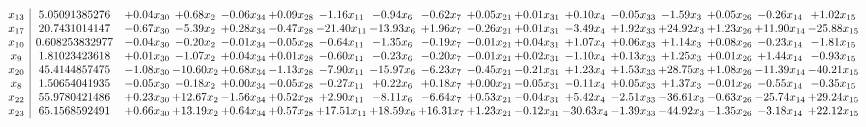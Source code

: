 \documentclass[9pt]{article}
\begin{document}
 \[\begin{array}{c| c c@{\hskip 2pt} c@{\hskip 2pt} c@{\hskip 2pt} c@{\hskip 2pt} c@{\hskip 2pt} c@{\hskip 2pt} c@{\hskip 2pt} c@{\hskip 2pt} c@{\hskip 2pt} c@{\hskip 2pt} c@{\hskip 2pt} c@{\hskip 2pt} c@{\hskip 2pt} c@{\hskip 2pt} c@{\hskip 2pt} }
 x_{13}   &  5.05091385276 & +  0.04 x_{30} & +  0.68 x_{2} & -0.06 x_{34} & +  0.09 x_{28} & -1.16 x_{11} & -0.94 x_{6} & -0.62 x_{7} & +  0.05 x_{21} & +  0.01 x_{31} & +  0.10 x_{4} & -0.05 x_{33} & -1.59 x_{3} & +  0.05 x_{26} & -0.26 x_{14} & +  1.02 x_{15}\\
 x_{17}   &  20.7431014147 & -0.67 x_{30} & -5.39 x_{2} & +  0.28 x_{34} & -0.47 x_{28} & -21.40 x_{11} & -13.93 x_{6} & +  1.96 x_{7} & -0.26 x_{21} & +  0.01 x_{31} & -3.49 x_{4} & +  1.92 x_{33} & + 24.92 x_{3} & +  1.23 x_{26} & + 11.90 x_{14} & -25.88 x_{15}\\
 x_{10}   &  0.608253832977 & -0.04 x_{30} & -0.20 x_{2} & -0.01 x_{34} & -0.05 x_{28} & -0.64 x_{11} & -1.35 x_{6} & -0.19 x_{7} & -0.01 x_{21} & +  0.04 x_{31} & +  1.07 x_{4} & +  0.06 x_{33} & +  1.14 x_{3} & +  0.08 x_{26} & -0.23 x_{14} & -1.81 x_{15}\\
 x_{9}   &  1.81023423618 & +  0.01 x_{30} & -1.07 x_{2} & +  0.04 x_{34} & +  0.01 x_{28} & -0.60 x_{11} & -0.23 x_{6} & -0.20 x_{7} & -0.01 x_{21} & +  0.02 x_{31} & -1.10 x_{4} & +  0.13 x_{33} & +  1.25 x_{3} & +  0.01 x_{26} & +  1.44 x_{14} & -0.93 x_{15}\\
 x_{20}   &  45.4144857475 & -1.08 x_{30} & -10.60 x_{2} & +  0.68 x_{34} & -1.13 x_{28} & -7.90 x_{11} & -15.97 x_{6} & -6.23 x_{7} & -0.45 x_{21} & -0.21 x_{31} & +  1.23 x_{4} & +  1.53 x_{33} & + 28.75 x_{3} & +  1.08 x_{26} & -11.39 x_{14} & -40.21 x_{15}\\
 x_{8}   &  1.50654041935 & -0.05 x_{30} & -0.18 x_{2} & +  0.00 x_{34} & -0.05 x_{28} & -0.27 x_{11} & +  0.22 x_{6} & +  0.18 x_{7} & +  0.00 x_{21} & -0.05 x_{31} & -0.11 x_{4} & +  0.05 x_{33} & +  1.37 x_{3} & -0.01 x_{26} & -0.55 x_{14} & -0.35 x_{15}\\
 x_{22}   &  55.9780421486 & +  0.23 x_{30} & + 12.67 x_{2} & -1.56 x_{34} & +  0.52 x_{28} & +  2.90 x_{11} & -8.11 x_{6} & -6.64 x_{7} & +  0.53 x_{21} & -0.04 x_{31} & +  5.42 x_{4} & -2.51 x_{33} & -36.61 x_{3} & -0.63 x_{26} & -25.74 x_{14} & + 29.24 x_{15}\\
 x_{23}   &  65.1568592491 & +  0.66 x_{30} & + 13.19 x_{2} & +  0.64 x_{34} & +  0.57 x_{28} & + 17.51 x_{11} & + 18.59 x_{6} & + 16.31 x_{7} & +  1.23 x_{21} & -0.12 x_{31} & -30.63 x_{4} & -1.39 x_{33} & -44.92 x_{3} & -1.35 x_{26} & -3.18 x_{14} & + 22.12 x_{15}\\

\end{array}\]
\end{document}
